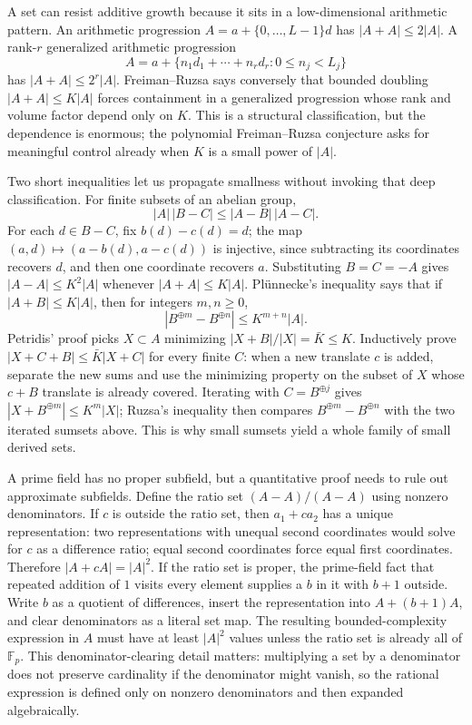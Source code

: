 A set can resist additive growth because it sits in a low-dimensional arithmetic pattern. An arithmetic progression \(A=a+\{0,\ldots,L-1\}d\) has \(|A+A|\le 2|A|\). A rank-\(r\) generalized arithmetic progression \[
A=a+\{n_1d_1+\cdots+n_rd_r:0\le n_j<L_j\}
\] has \(|A+A|\le 2^r|A|\). Freiman--Ruzsa says conversely that bounded doubling \(|A+A|\le K|A|\) forces containment in a generalized progression whose rank and volume factor depend only on \(K\). This is a structural classification, but the dependence is enormous; the polynomial Freiman--Ruzsa conjecture asks for meaningful control already when \(K\) is a small power of \(|A|\).

Two short inequalities let us propagate smallness without invoking that deep classification. For finite subsets of an abelian group, \[
|A|\,|B-C|\le |A-B|\,|A-C|.
\] For each \(d\in B-C\), fix \(b(d)-c(d)=d\); the map \((a,d)\mapsto(a-b(d),a-c(d))\) is injective, since subtracting its coordinates recovers \(d\), and then one coordinate recovers \(a\). Substituting \(B=C=-A\) gives \(|A-A|\le K^2|A|\) whenever \(|A+A|\le K|A|\). Plünnecke's inequality says that if \(|A+B|\le K|A|\), then for integers \(m,n\ge0\), \[
|B^{\oplus m}-B^{\oplus n}|\le K^{m+n}|A|.
\] Petridis' proof picks \(X\subset A\) minimizing \(|X+B|/|X|=\bar K\le K\). Inductively prove \(|X+C+B|\le\bar K|X+C|\) for every finite \(C\): when a new translate \(c\) is added, separate the new sums and use the minimizing property on the subset of \(X\) whose \(c+B\) translate is already covered. Iterating with \(C=B^{\oplus j}\) gives \(|X+B^{\oplus m}|\le K^m|X|\); Ruzsa's inequality then compares \(B^{\oplus m}-B^{\oplus n}\) with the two iterated sumsets above. This is why small sumsets yield a whole family of small derived sets.

A prime field has no proper subfield, but a quantitative proof needs to rule out approximate subfields. Define the ratio set \((A-A)/(A-A)\) using nonzero denominators. If \(c\) is outside the ratio set, then \(a_1+ca_2\) has a unique representation: two representations with unequal second coordinates would solve for \(c\) as a difference ratio; equal second coordinates force equal first coordinates. Therefore \(|A+cA|=|A|^2\). If the ratio set is proper, the prime-field fact that repeated addition of \(1\) visits every element supplies a \(b\) in it with \(b+1\) outside. Write \(b\) as a quotient of differences, insert the representation into \(A+(b+1)A\), and clear denominators as a literal set map. The resulting bounded-complexity expression in \(A\) must have at least \(|A|^2\) values unless the ratio set is already all of \(\mathbb F_p\). This denominator-clearing detail matters: multiplying a set by a denominator does not preserve cardinality if the denominator might vanish, so the rational expression is defined only on nonzero denominators and then expanded algebraically.

